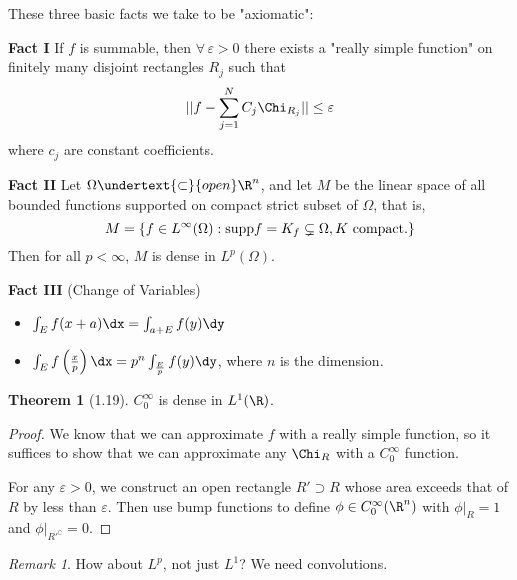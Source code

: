 \documentclass[a5paper]{article}
\theoremstyle{definition}%
\newtheorem{theorem}{Theorem}
\numberwithin{exercise}{section}
\theoremstyle{remark}%
\newtheorem*{remark*}{Remark}
\newcommand{\subsetopen}{\undertext{\subset}{open}}
\renewcommand{\epsilon}{\varepsilon}
\begin{document}
	These three basic facts we take to be "axiomatic":
\begin{highlight}
	\textbf{Fact I} If $f$ is summable, then $\forall\,\epsilon>0$ there exists a "really simple function" on finitely many disjoint rectangles $R_j$ such that 
	$$\norm{f-\sum_{j=1}^N C_j\Chi_{R_j}}\leq\epsilon$$
	where $c_j$ are constant coefficients. 
\end{highlight}
\begin{highlight}

	\textbf{Fact II} Let $\Omega\subsetopen\R^n$, and let $M$ be the linear space of all bounded functions supported on compact strict subset of $\Omega$, that is, 
	$$M=\left\lbrace f\in L^\infty(\Omega) : \text{supp} f=K_f\subsetneq\Omega, K\text{ compact}.\right\rbrace$$
	Then for all $p<\infty$, $M$ is dense in $L^p(\Omega)$.\footnotemark
\end{highlight}
\begin{highlight}
	
	\textbf{Fact III} (Change of Variables)\footnotemark 
		\begin{itemize}
		\item $\int_E f(x+a)\dx = \int_{a+E} f(y)\dy$
		\item $\int_E f\left(\frac{x}{p}\right)\dx = p^n\int_{\frac{E}{p}} f(y)\dy$, where $n$ is the dimension. 
		\end{itemize}

\end{highlight}

\begin{theorem}[1.19]
$C_0^\infty$ is dense in $L^1(\R)$. 
\end{theorem}
\begin{proof}
We know that we can approximate $f$ with a really simple function, so it suffices to show that we can approximate any $\Chi_R$ with a $C^\infty_0$ function. 

For any $\epsilon>0$, we construct an open rectangle $R'\supset R$ whose area exceeds that of $R$ by less than $\epsilon$. 
Then use bump functions to define $\phi\in C^\infty_0(\R^n)$ with $\phi|_R=1$ and $\phi|_{{R'}^\complement}=0$. 
\end{proof}

\begin{remark*}
How about $L^p$, not just $L^1$? We need convolutions. 
\end{remark*}
\end{document}
